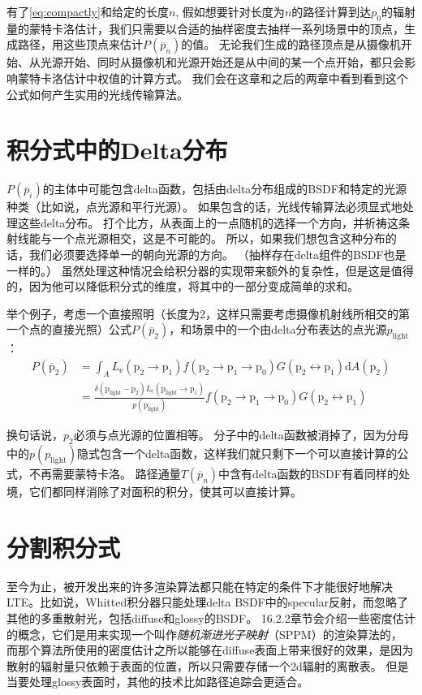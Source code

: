 \documentclass[a4paper]{article}
\begin{document}
	有了\eqref{eq:compactly}和给定的长度$n$, 假如想要针对长度为$n$的路径计算到达$p_0$的辐射量的蒙特卡洛估计，我们只需要以合适的抽样密度去抽样一系列场景中的顶点，生成路径，用这些顶点来估计$P(\overline{p}_n)$的值。
	无论我们生成的路径顶点是从摄像机开始、从光源开始、同时从摄像机和光源开始还是从中间的某一个点开始，都只会影响蒙特卡洛估计中权值的计算方式。
	我们会在这章和之后的两章中看到看到这个公式如何产生实用的光线传输算法。

	\section{积分式中的Delta分布}
	$P(\overline{p}_i)$的主体中可能包含delta函数，包括由delta分布组成的BSDF和特定的光源种类（比如说，点光源和平行光源）。
	如果包含的话，光线传输算法必须显式地处理这些delta分布。
	打个比方，从表面上的一点随机的选择一个方向，并祈祷这条射线能与一个点光源相交，这是不可能的。
	所以，如果我们想包含这种分布的话，我们必须要选择单一的朝向光源的方向。
	（抽样存在delta组件的BSDF也是一样的。）
	虽然处理这种情况会给积分器的实现带来额外的复杂性，但是这是值得的，因为他可以降低积分式的维度，将其中的一部分变成简单的求和。

	举个例子，考虑一个直接照明（长度为2，这样只需要考虑摄像机射线所相交的第一个点的直接光照）公式$P(\overline{p}_2)$，和场景中的一个由delta分布表达的点光源$p_{\mathrm{light}}$：
	\begin{align*}
		P\left(\overline{\mathrm{p}}_{2}\right) &=\int_{A} L_{\mathrm{e}}\left(\mathrm{p}_{2} \rightarrow \mathrm{p}_{1}\right) f\left(\mathrm{p}_{2} \rightarrow \mathrm{p}_{1} \rightarrow \mathrm{p}_{0}\right) G\left(\mathrm{p}_{2} \leftrightarrow \mathrm{p}_{1}\right) \mathrm{d} A\left(\mathrm{p}_{2}\right) \\
		&=\frac{\delta\left(\mathrm{p}_{\mathrm{light}}-\mathrm{p}_{2}\right) L_{\mathrm{e}}\left(\mathrm{p}_{\mathrm{light}} \rightarrow \mathrm{p}_{1}\right)}{p\left(\mathrm{p}_{\mathrm{light}}\right)} f\left(\mathrm{p}_{2} \rightarrow \mathrm{p}_{1} \rightarrow \mathrm{p}_{0}\right) G\left(\mathrm{p}_{2} \leftrightarrow \mathrm{p}_{1}\right)
	\end{align*}

	换句话说，$p_2$必须与点光源的位置相等。
	分子中的delta函数被消掉了，因为分母中的$p(p_{\mathrm{light}})$隐式包含一个delta函数，这样我们就只剩下一个可以直接计算的公式，不再需要蒙特卡洛。
	路径通量$T(\overline{p}_n)$中含有delta函数的BSDF有着同样的处境，它们都同样消除了对面积的积分，使其可以直接计算。

	\section{分割积分式}
	至今为止，被开发出来的许多渲染算法都只能在特定的条件下才能很好地解决LTE。比如说，Whitted积分器只能处理delta BSDF中的specular反射，而忽略了其他的多重散射光，包括diffuse和glossy的BSDF。
	16.2.2章节会介绍一些密度估计的概念，它们是用来实现一个叫作\textit{随机渐进光子映射}（SPPM）的渲染算法的，
	而那个算法所使用的密度估计之所以能够在diffuse表面上带来很好的效果，是因为散射的辐射量只依赖于表面的位置，所以只需要存储一个2d辐射的离散表。
	但是当要处理glossy表面时，其他的技术比如路径追踪会更适合。
	
\end{document}
